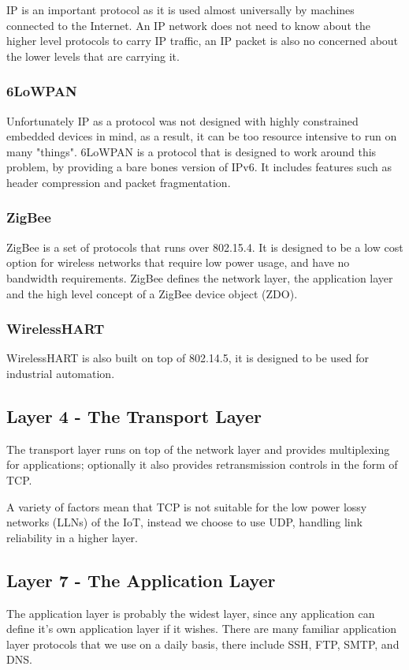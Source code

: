 \documentclass[10pt,journal,compsoc]{IEEEtran}
\begin{document}
IP is an important protocol as it is used almost universally by machines
connected to the Internet. An IP network does not need to know about the higher
level protocols to carry IP traffic, an IP packet is also no concerned about
the lower levels that are carrying it. 

\subsubsection{6LoWPAN}
Unfortunately IP as a protocol was not designed with highly constrained
embedded devices in mind, as a result, it can be too resource intensive to run
on many "things". 6LoWPAN is a protocol that is designed to work around this
problem, by providing a bare bones version of IPv6. It includes features such
as header compression and packet fragmentation.  

\subsubsection{ZigBee}
ZigBee is a set of protocols that runs over 802.15.4. It is designed to be a
low cost option for wireless networks that require low power usage, and have no
bandwidth requirements. ZigBee defines the network layer, the application layer
and the high level concept of a ZigBee device object (ZDO). 

\subsubsection{WirelessHART}
WirelessHART is also built on top of 802.14.5, it is designed to be used for
industrial automation. 

\subsection{Layer 4 - The Transport Layer}
The transport layer runs on top of the network layer and provides multiplexing
for applications; optionally it also provides retransmission controls in
the form of TCP. 

A variety of factors mean that TCP is not suitable for the low power lossy
networks (LLNs) of the IoT, instead we choose to use UDP, handling link
reliability in a higher layer.

\subsection{Layer 7 - The Application Layer}
The application layer is probably the widest layer, since any application can
define it's own application layer if it wishes. There are many familiar
application layer protocols that we use on a daily basis, there include SSH,
FTP, SMTP, and DNS. 
\end{document}
